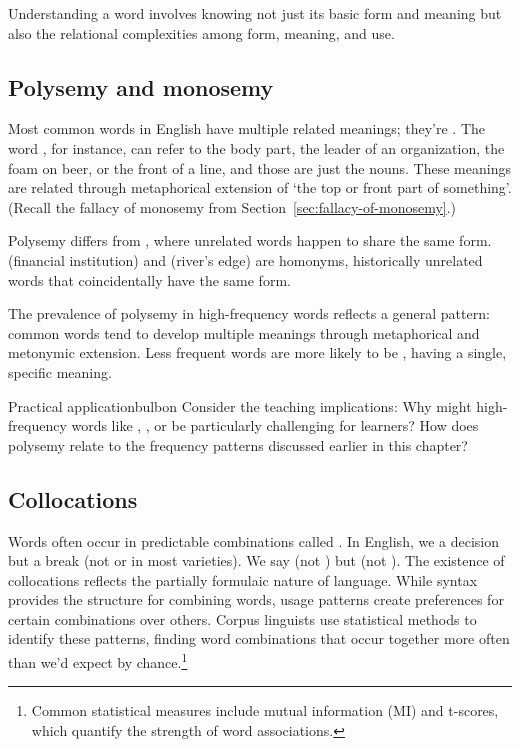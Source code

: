 Understanding a word involves knowing not just its basic form and meaning but also the relational complexities among form, meaning, and use.

\subsection{Polysemy and monosemy} \label{sec:polysemy}

Most common words in English have multiple related meanings; they're . The word , for instance, can refer to the body part, the leader of an organization, the foam on beer, or the front of a line, and those are just the nouns. These meanings are related through metaphorical extension of `the top or front part of something'. (Recall the fallacy of monosemy from Section~\ref{sec:fallacy-of-monosemy}.)

Polysemy differs from , where unrelated words happen to share the same form.  (financial institution) and  (river's edge) are homonyms, historically unrelated words that coincidentally have the same form.

The prevalence of polysemy in high-frequency words reflects a general pattern: common words tend to develop multiple meanings through metaphorical and metonymic extension. Less frequent words are more likely to be , having a single, specific meaning.

\begin{tblsfilledsymbol}{Practical application}{bulbon}
Consider the teaching implications: Why might high-frequency words like , , or  be particularly challenging for learners? How does polysemy relate to the frequency patterns discussed earlier in this chapter?
\end{tblsfilledsymbol}

\subsection{Collocations} \label{sec:collocations}

Words often occur in predictable combinations called . In English, we  a decision but  a break (not  or  in most varieties). We say  (not ) but  (not ). The existence of collocations reflects the partially formulaic nature of language. While syntax provides the structure for combining words, usage patterns create preferences for certain combinations over others. Corpus linguists use statistical methods to identify these patterns, finding word combinations that occur together more often than we'd expect by chance.\footnote{Common statistical measures include mutual information (MI) and t-scores, which quantify the strength of word associations.}

